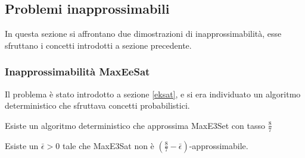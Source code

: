 \subsection{Problemi inapprossimabili}
In questa sezione si affrontano due dimostrazioni di inapprossimabilità, 
esse sfruttano i concetti introdotti a sezione precedente.

\subsubsection{Inapprossimabilità MaxEeSat}
Il problema è stato introdotto a sezione \ref{eksat}, e si era individuato un algoritmo 
deterministico che sfruttava concetti probabilistici.

\begin{theorem}
    Esiste un algoritmo deterministico che approssima MaxE3Set con tasso
    $\frac{8}{7}$
\end{theorem}

\begin{theorem}
    \label{th1ek}
    Esiste un $\bar{\epsilon} > 0$ tale che MaxE3Sat non è $(\frac{8}{7}-\bar{\epsilon})$-approssimabile. 
\end{theorem}

